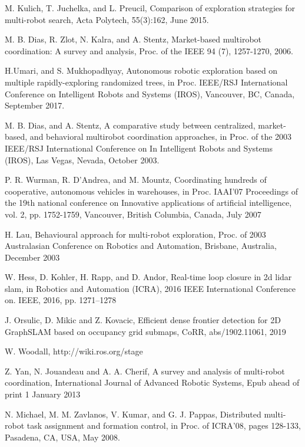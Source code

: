 \documentclass[letterpaper, 10 pt, conference]{ieeeconf}  %
\begin{document}
\begin{thebibliography}{99}
 M. Kulich, T. Juchelka, and L. Preucil, Comparison of exploration strategies for multi-robot search, Acta Polytech, 55(3):162, June 2015. 

 M. B. Dias, R. Zlot, N. Kalra, and A. Stentz, Market-based multirobot coordination: A survey and analysis, Proc. of the IEEE 94 (7), 1257-1270, 2006.

 H.Umari, and S. Mukhopadhyay, Autonomous robotic exploration based on multiple rapidly-exploring randomized trees,  in Proc. IEEE/RSJ International Conference on Intelligent Robots and Systems (IROS), Vancouver, BC, Canada, September 2017.

 M. B. Dias, and A. Stentz, A comparative study between centralized, market-based, and behavioral multirobot coordination approaches, in Proc. of the 2003 IEEE/RSJ  International Conference on In Intelligent Robots and Systems (IROS), Las Vegas, Nevada, October 2003.

 P. R. Wurman, R. D'Andrea, and M. Mountz, Coordinating hundreds of cooperative, autonomous vehicles in warehouses, in Proc. IAAI'07 Proceedings of the 19th national conference on Innovative applications of artificial intelligence, vol. 2, pp. 1752-1759, Vancouver, British Columbia, Canada, July 2007
 
 H. Lau, Behavioural approach for multi-robot exploration, Proc. of 2003 Australasian Conference on Robotics and Automation, Brisbane, Australia, December 2003

 W.  Hess,  D.  Kohler,  H.  Rapp,  and  D.  Andor, Real-time  loop  closure in  2d  lidar  slam, in Robotics  and  Automation  (ICRA), 2016  IEEE International Conference on. IEEE, 2016, pp. 1271–1278

 J. Orsulic, D. Mikic and Z. Kovacic, Efficient dense frontier detection for 2D GraphSLAM based on occupancy grid submaps, CoRR, abs/1902.11061, 2019

 W. Woodall, http://wiki.ros.org/stage

 Z. Yan, N. Jouandeau and A. A. Cherif, A survey and analysis of multi-robot coordination, International Journal of Advanced Robotic Systems, Epub ahead of print 1 January 2013

 N. Michael, M. M. Zavlanos, V. Kumar, and G. J. Pappas, Distributed multi-robot task assignment and formation control, in Proc. of ICRA'08, pages 128-133, Pasadena, CA, USA, May 2008.

\end{thebibliography}
\end{document}

